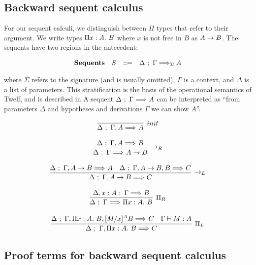 \documentclass[11pt,twoside]{article}
\begin{document}
\subsection{Backward sequent calculus}
For our sequent calculi, we distinguish between $\Pi$ types
that refer to their argument.  We write types 
$\Pi x : A.\ B$ where $x$ is not free in $B$ as
$A \to B$.  The sequents have two regions in the antecedent:

\newcommand{\Sequent}[4][]{#2\ ;\ #3 \SeqArr_{#1} #4}

$$
\begin{array}{llll}
\mathbf{Sequents} & S & ::= & \Sequent[\Sigma]{\Delta}{\Gamma}{A} \\
\end{array} 
$$

\noindent 
where $\Sigma$ refers to the signature (and is usually omitted),
$\Gamma$ is a context, and $\Delta$ is a list of parameters.   
This stratification is the basis of the operational semantics
of Twelf, and is described in 
A sequent $\Sequent{\Delta}{\Gamma}{A}$
can be interpreted as ``from parameters $\Delta$ and hypotheses 
and derivations $\Gamma$ we can show $A$''.  

$$
\begin{array}{c}
\infer[init]{\Sequent{\Delta}{\Gamma,A}{A}}{} \\\\
\infer[\LFArr_R]{\Sequent{\Delta}{\Gamma}{A\LFArr B}}
                {\Sequent{\Delta}{\Gamma,A}{B}} \\\\
\infer[\LFArr_L]{\Sequent{\Delta}{\Gamma,A\LFArr B}{C}}
                {\Sequent{\Delta}{\Gamma,A\LFArr B}{A} & 
                 \Sequent{\Delta}{\Gamma,A\LFArr B,B}{C}}\\\\
\infer[\Pi_R]{\Sequent{\Delta}{\Gamma}{\PiTyp{x}{A}{B}}}
             {\Sequent{\Delta,x:A}{\Gamma}{B}} \\\\
\infer[\Pi_L]{\Sequent{\Delta}{\Gamma,\PiTyp{x}{A}{B}}{C}}
             {\Sequent{\Delta}{\Gamma,\PiTyp{x}{A}{B},\HSub{M}{x}{A}{B}}{C} & 
              \Gamma \vdash M : A}
\end{array} 
$$

\subsection{Proof terms for backward sequent calculus}
\end{document}

